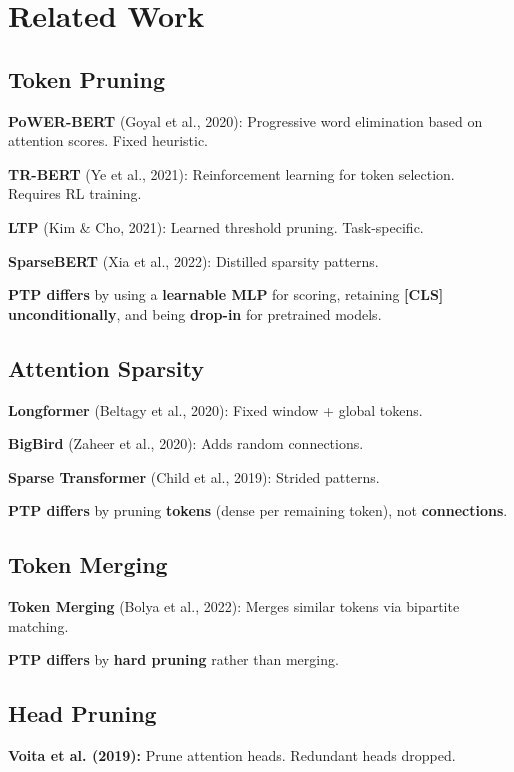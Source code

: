 
\section{Related Work}

\subsection{Token Pruning}

\textbf{PoWER-BERT} (Goyal et al., 2020): Progressive word elimination based on 
attention scores. Fixed heuristic.

\textbf{TR-BERT} (Ye et al., 2021): Reinforcement learning for token selection. 
Requires RL training.

\textbf{LTP} (Kim \& Cho, 2021): Learned threshold pruning. Task-specific.

\textbf{SparseBERT} (Xia et al., 2022): Distilled sparsity patterns.

\textbf{PTP differs} by using a \textbf{learnable MLP} for scoring, retaining 
\textbf{[CLS] unconditionally}, and being \textbf{drop-in} for pretrained models.

\subsection{Attention Sparsity}

\textbf{Longformer} (Beltagy et al., 2020): Fixed window + global tokens.

\textbf{BigBird} (Zaheer et al., 2020): Adds random connections.

\textbf{Sparse Transformer} (Child et al., 2019): Strided patterns.

\textbf{PTP differs} by pruning \textbf{tokens} (dense per remaining token), not 
\textbf{connections}.

\subsection{Token Merging}

\textbf{Token Merging} (Bolya et al., 2022): Merges similar tokens via bipartite 
matching.

\textbf{PTP differs} by \textbf{hard pruning} rather than merging.

\subsection{Head Pruning}

\textbf{Voita et al. (2019):} Prune attention heads. Redundant heads dropped.

